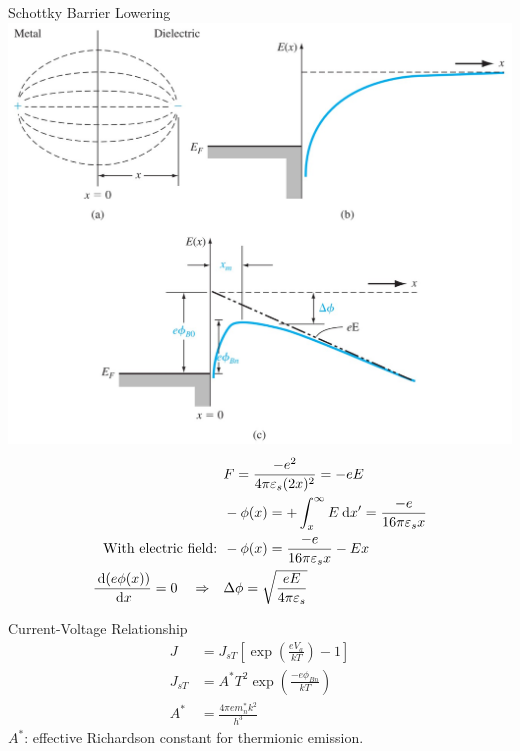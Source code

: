 \documentclass[a4paper, twocolumn]{article}
\begin{document}
    \par Schottky Barrier Lowering \\
        \includegraphics[width=0.9\linewidth]{Schottky-barrier-lowering.jpg}
    \begin{equation*}
        \begin{aligned}
            &F = \frac{-e^2}{4 \pi \varepsilon_s (2x)^2} = -eE \\
            &-\phi(x) = + \int_x^\infty E \: \mathrm{d} x^\prime = \frac{-e}{16\pi \varepsilon_s x} \\ 
            \text{With electric field: } & -\phi(x) = \frac{-e}{16 \pi \varepsilon_s x} - Ex  \\
            \frac{\: \mathrm{d} (e \phi(x))}{\: \mathrm{d} x} = 0 \quad \Rightarrow \quad & \Delta \phi = \sqrt{\frac{eE}{4\pi \varepsilon_s} }  
        \end{aligned}
    \end{equation*}
    
    \par Current-Voltage Relationship 
    \begin{equation*}
        \begin{aligned}
            J &= J_{sT} \left[ \exp\left( \frac{eV_a}{kT}  \right) - 1 \right] \\
            J_{sT} &= A^* T^2 \exp \left( \frac{-e \phi_{Bn} }{kT}  \right) \\
            A^* &= \frac{4\pi e m_n^* k^2}{h^3} 
        \end{aligned}
    \end{equation*}
    $A^*$: effective Richardson constant for thermionic emission. \\
    
\end{document}
